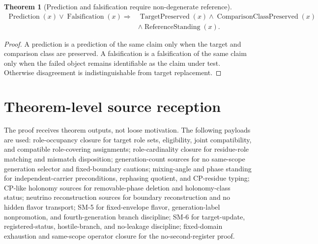\documentclass[11pt]{article}
\newcommand{\TargetPreserved}{\operatorname{TargetPreserved}}
\newcommand{\ComparisonClassPreserved}{\operatorname{ComparisonClassPreserved}}
\newcommand{\ReferenceStanding}{\operatorname{ReferenceStanding}}
\newcommand{\Prediction}{\operatorname{Prediction}}
\newcommand{\Falsification}{\operatorname{Falsification}}
\theoremstyle{definition}
\theoremstyle{plain}
\newtheorem{theorem}{Theorem}[section]
\theoremstyle{remark}
\begin{document}
\begin{theorem}[Prediction and falsification require non-degenerate reference]
\[
\begin{aligned}
\Prediction(x)\vee\Falsification(x)\Rightarrow{}&\TargetPreserved(x)\wedge\ComparisonClassPreserved(x)\\
&\wedge\ReferenceStanding(x).
\end{aligned}
\]
\end{theorem}
\begin{proof}
A prediction is a prediction of the same claim only when the target and comparison class are preserved. A falsification is a falsification of the same claim only when the failed object remains identifiable as the claim under test. Otherwise disagreement is indistinguishable from target replacement.
\end{proof}

\section{Theorem-level source reception}

The proof receives theorem outputs, not loose motivation. The following payloads are used: role-occupancy closure for target role sets, eligibility, joint compatibility, and compatible role-covering assignments; role-cardinality closure for residue-role matching and mismatch disposition; generation-count sources for no same-scope generation selector and fixed-boundary cautions; mixing-angle and phase standing for independent-carrier preconditions, rephasing quotient, and CP-residue typing; CP-like holonomy sources for removable-phase deletion and holonomy-class status; neutrino reconstruction sources for boundary reconstruction and no hidden flavor transport; SM-5 for fixed-envelope flavor, generation-label nonpromotion, and fourth-generation branch discipline; SM-6 for target-update, registered-status, hostile-branch, and no-leakage discipline; fixed-domain exhaustion and same-scope operator closure for the no-second-register proof.
\end{document}
